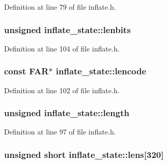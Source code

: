 Definition at line 79 of file inflate.\-h.

\hypertarget{structinflate__state_a3ff97e6b230d7551fc848ff9de0236e9}{
\subsubsection[{lenbits}]{\setlength{\rightskip}{0pt plus 5cm}unsigned inflate\-\_\-state\-::lenbits}}\label{structinflate__state_a3ff97e6b230d7551fc848ff9de0236e9}


Definition at line 104 of file inflate.\-h.

\hypertarget{structinflate__state_a4560e1eb3318f7ea41896be84de0679a}{
\subsubsection[{lencode}]{ const F\-A\-R$\ast$ inflate\-\_\-state\-::lencode}}\label{structinflate__state_a4560e1eb3318f7ea41896be84de0679a}


Definition at line 102 of file inflate.\-h.

\hypertarget{structinflate__state_a5179d4c9b332d976cce7c6cce6bdf3c1}{
\subsubsection[{length}]{\setlength{\rightskip}{0pt plus 5cm}unsigned inflate\-\_\-state\-::length}}\label{structinflate__state_a5179d4c9b332d976cce7c6cce6bdf3c1}


Definition at line 97 of file inflate.\-h.

\hypertarget{structinflate__state_aa0620e64487c48635f6c3a11a0aeb99d}{
\subsubsection[{lens}]{\setlength{\rightskip}{0pt plus 5cm}unsigned short inflate\-\_\-state\-::lens\mbox{[}320\mbox{]}}}\label{structinflate__state_aa0620e64487c48635f6c3a11a0aeb99d}


